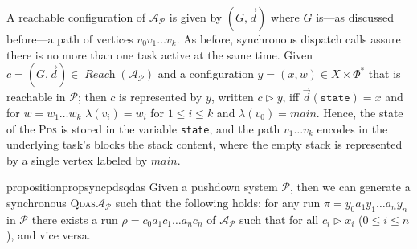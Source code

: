 \documentclass[runningheads,oribibl,]{article}
\newcommand{\Aa}{\ensuremath{\mathcal{A}}\xspace}
\newcommand{\Pp}{\ensuremath{\mathcal{P}}\xspace}
\newcommand{\main}{\ensuremath{\textit{main}}\xspace}
\newcommand{\pds}{\textsc{Pds}\xspace}
\newcommand{\qdas}{\textsc{Qdas}\xspace}
\DeclareMathOperator{\Reach}{\textit{Reach}}
\newcommand{\Graph}{\ensuremath{G}}
\newcommand{\Data}{\ensuremath{\vec{d}}}
\begin{document}
A reachable configuration of $\Aa_\Pp$
is given by $(\Graph,\Data)$ where $\Graph$ is---as discussed before---a
path of vertices $v_0v_1\dots v_k$. As before, synchronous dispatch calls assure
there is no more than one task
active at the same time. Given $c=(\Graph,\Data)\in\Reach(\Aa_\Pp)$
and a configuration $y=(x,w)\in X\times \Phi^*$ that is reachable in $\Pp$; then
$c$ is represented by $y$, written $c \triangleright y$, iff
$\Data(\texttt{state})=x$ and for $w=w_1\dots w_k$
$\lambda(v_i)=w_i$ for $1\leq i\leq k$ and $\lambda(v_0)=\main$. Hence, the state
of the \pds is stored in the variable \texttt{state}, and the path $v_1\dots v_k$
encodes in the underlying task's blocks the stack content, where the empty stack
is represented by a single vertex labeled by \main.

\begin{restatable}{proposition}{propsyncpdsqdas}
\label{prop:sync_pds_qdas}  Given a pushdown system $\Pp$, then we can generate  a
  synchronous \qdas $\Aa_\Pp$ such that the following holds:
  for any
  run $\pi=y_0a_1y_1\dots a_ny_n$ in $\Pp$ there exists a
  run $\rho=c_0a_1c_1\dots a_nc_n$ of $\Aa_\Pp$ such that
  for all $c_i\triangleright x_i$
  ($0\leq i \leq n$),
  and vice versa.
\end{restatable}
\end{document}

